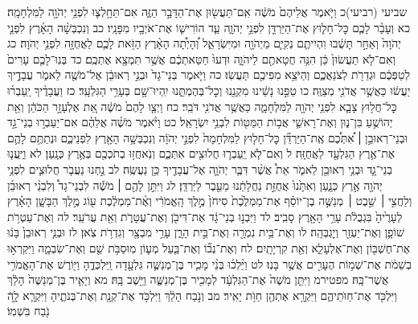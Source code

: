 \documentclass[twoside, openany, parskip=half, 11pt]{book}
\begin{document}
שביעי (רביעי)כ וַיֹּ֤אמֶר אֲלֵיהֶם֙ מֹשֶׁ֔ה אִֽם־תַּעֲשׂ֖וּן אֶת־הַדָּבָ֣ר הַזֶּ֑ה אִם־תֵּחָ֥לְצ֛וּ לִפְנֵ֥י יְהֹוָ֖ה לַמִּלְחָמָֽה׃ כא וְעָבַ֨ר לָכֶ֧ם כׇּל־חָל֛וּץ אֶת־הַיַּרְדֵּ֖ן לִפְנֵ֣י יְהֹוָ֑ה עַ֧ד הוֹרִישׁ֛וֹ אֶת־אֹיְבָ֖יו מִפָּנָֽיו׃ כב וְנִכְבְּשָׁ֨ה הָאָ֜רֶץ לִפְנֵ֤י יְהֹוָה֙ וְאַחַ֣ר תָּשֻׁ֔בוּ וִהְיִיתֶ֧ם נְקִיִּ֛ם מֵיְהֹוָ֖ה וּמִיִּשְׂרָאֵ֑ל וְ֠הָיְתָ֠ה הָאָ֨רֶץ הַזֹּ֥את לָכֶ֛ם לַאֲחֻזָּ֖ה לִפְנֵ֥י יְהֹוָה׃ כג וְאִם־לֹ֤א תַעֲשׂוּן֙ כֵּ֔ן הִנֵּ֥ה חֲטָאתֶ֖ם לַיהֹוָ֑ה וּדְעוּ֙ חַטַּאתְכֶ֔ם אֲשֶׁ֥ר תִּמְצָ֖א אֶתְכֶֽם׃ כד בְּנֽוּ־לָכֶ֤ם עָרִים֙ לְטַפְּכֶ֔ם וּגְדֵרֹ֖ת לְצֹנַאֲכֶ֑ם וְהַיֹּצֵ֥א מִפִּיכֶ֖ם תַּעֲשֽׂוּ׃ כה וַיֹּ֤אמֶר בְּנֵי־גָד֙ וּבְנֵ֣י רְאוּבֵ֔ן אֶל־מֹשֶׁ֖ה לֵאמֹ֑ר עֲבָדֶ֣יךָ יַעֲשׂ֔וּ כַּאֲשֶׁ֥ר אֲדֹנִ֖י מְצַוֶּֽה׃ כו טַפֵּ֣נוּ נָשֵׁ֔ינוּ מִקְנֵ֖נוּ וְכׇל־בְּהֶמְתֵּ֑נוּ יִֽהְיוּ־שָׁ֖ם בְּעָרֵ֥י הַגִּלְעָֽד׃ כז וַעֲבָדֶ֨יךָ יַֽעַבְר֜וּ כׇּל־חֲל֥וּץ צָבָ֛א לִפְנֵ֥י יְהֹוָ֖ה לַמִּלְחָמָ֑ה כַּאֲשֶׁ֥ר אֲדֹנִ֖י דֹּבֵֽר׃ כח וַיְצַ֤ו לָהֶם֙ מֹשֶׁ֔ה אֵ֚ת אֶלְעָזָ֣ר הַכֹּהֵ֔ן וְאֵ֖ת יְהוֹשֻׁ֣עַ בִּן־נ֑וּן וְאֶת־רָאשֵׁ֛י אֲב֥וֹת הַמַּטּ֖וֹת לִבְנֵ֥י יִשְׂרָאֵֽל׃ כט וַיֹּ֨אמֶר מֹשֶׁ֜ה אֲלֵהֶ֗ם אִם־יַעַבְר֣וּ בְנֵי־גָ֣ד וּבְנֵי־רְאוּבֵ֣ן ׀ אִ֠תְּכֶ֠ם אֶֽת־הַיַּרְדֵּ֞ן כׇּל־חָל֤וּץ לַמִּלְחָמָה֙ לִפְנֵ֣י יְהֹוָ֔ה וְנִכְבְּשָׁ֥ה הָאָ֖רֶץ לִפְנֵיכֶ֑ם וּנְתַתֶּ֥ם לָהֶ֛ם אֶת־אֶ֥רֶץ הַגִּלְעָ֖ד לַאֲחֻזָּֽה׃ ל וְאִם־לֹ֧א יַֽעַבְר֛וּ חֲלוּצִ֖ים אִתְּכֶ֑ם וְנֹֽאחֲז֥וּ בְתֹכְכֶ֖ם בְּאֶ֥רֶץ כְּנָֽעַן׃ לא וַיַּֽעֲנ֧וּ בְנֵי־גָ֛ד וּבְנֵ֥י רְאוּבֵ֖ן לֵאמֹ֑ר אֵת֩ אֲשֶׁ֨ר דִּבֶּ֧ר יְהֹוָ֛ה אֶל־עֲבָדֶ֖יךָ כֵּ֥ן נַעֲשֶֽׂה׃ לב נַ֣חְנוּ נַעֲבֹ֧ר חֲלוּצִ֛ים לִפְנֵ֥י יְהֹוָ֖ה אֶ֣רֶץ כְּנָ֑עַן וְאִתָּ֙נוּ֙ אֲחֻזַּ֣ת נַחֲלָתֵ֔נוּ מֵעֵ֖בֶר לַיַּרְדֵּֽן׃ לג וַיִּתֵּ֣ן לָהֶ֣ם ׀ מֹשֶׁ֡ה לִבְנֵי־גָד֩ וְלִבְנֵ֨י רְאוּבֵ֜ן וְלַחֲצִ֣י ׀ שֵׁ֣בֶט ׀ מְנַשֶּׁ֣ה בֶן־יוֹסֵ֗ף אֶת־מַמְלֶ֙כֶת֙ סִיחֹן֙ מֶ֣לֶךְ הָֽאֱמֹרִ֔י וְאֶ֨ת־מַמְלֶ֔כֶת ע֖וֹג מֶ֣לֶךְ הַבָּשָׁ֑ן הָאָ֗רֶץ לְעָרֶ֙יהָ֙ בִּגְבֻלֹ֔ת עָרֵ֥י הָאָ֖רֶץ סָבִֽיב׃ לד וַיִּבְנ֣וּ בְנֵי־גָ֔ד אֶת־דִּיבֹ֖ן וְאֶת־עֲטָרֹ֑ת וְאֵ֖ת עֲרֹעֵֽר׃ לה וְאֶת־עַטְרֹ֥ת שׁוֹפָ֛ן וְאֶת־יַעְזֵ֖ר וְיׇגְבְּהָֽה׃ לו וְאֶת־בֵּ֥ית נִמְרָ֖ה וְאֶת־בֵּ֣ית הָרָ֑ן עָרֵ֥י מִבְצָ֖ר וְגִדְרֹ֥ת צֹֽאן׃ לז וּבְנֵ֤י רְאוּבֵן֙ בָּנ֔וּ אֶת־חֶשְׁבּ֖וֹן וְאֶת־אֶלְעָלֵ֑א וְאֵ֖ת קִרְיָתָֽיִם׃ לח וְאֶת־נְב֞וֹ וְאֶת־בַּ֧עַל מְע֛וֹן מֽוּסַבֹּ֥ת שֵׁ֖ם וְאֶת־שִׂבְמָ֑ה וַיִּקְרְא֣וּ בְשֵׁמֹ֔ת אֶת־שְׁמ֥וֹת הֶעָרִ֖ים אֲשֶׁ֥ר בָּנֽוּ׃ לט וַיֵּ֨לְכ֜וּ בְּנֵ֨י מָכִ֧יר בֶּן־מְנַשֶּׁ֛ה גִּלְעָ֖דָה וַֽיִּלְכְּדֻ֑הָ וַיּ֖וֹרֶשׁ אֶת־הָאֱמֹרִ֥י אֲשֶׁר־בָּֽהּ׃ מפטירמ וַיִּתֵּ֤ן מֹשֶׁה֙ אֶת־הַגִּלְעָ֔ד לְמָכִ֖יר בֶּן־מְנַשֶּׁ֑ה וַיֵּ֖שֶׁב בָּֽהּ׃ מא וְיָאִ֤יר בֶּן־מְנַשֶּׁה֙ הָלַ֔ךְ וַיִּלְכֹּ֖ד אֶת־חַוֺּתֵיהֶ֑ם וַיִּקְרָ֥א אֶתְהֶ֖ן חַוֺּ֥ת יָאִֽיר׃ מב וְנֹ֣בַח הָלַ֔ךְ וַיִּלְכֹּ֥ד אֶת־קְנָ֖ת וְאֶת־בְּנֹתֶ֑יהָ וַיִּקְרָ֧א לָ֦הֿ נֹ֖בַח בִּשְׁמֽוֹ׃
\end{document}
